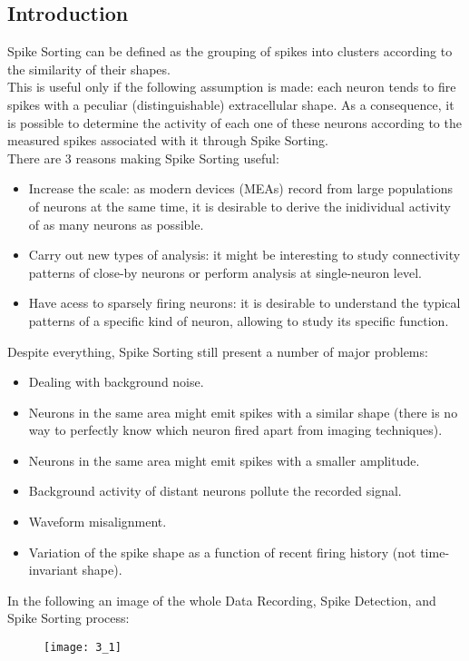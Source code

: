 \subsection{Introduction}
Spike Sorting can be defined as the grouping of spikes into clusters
according to the similarity of their shapes.\\
This is useful only if the following assumption is made: each neuron tends
to fire spikes with a peculiar (distinguishable) extracellular shape.
As a consequence, it is possible to determine the activity of each one of these
neurons according to the measured spikes associated with it through Spike Sorting.\\
There are 3 reasons making Spike Sorting useful:
\begin{itemize}
    \item Increase the scale: as modern devices (MEAs) record from large populations
          of neurons at the same time, it is desirable to derive the inidividual
          activity of as many neurons as possible.
    \item Carry out new types of analysis: it might be interesting to study
          connectivity patterns of close-by neurons or perform analysis at
          single-neuron level.
    \item Have acess to sparsely firing neurons: it is desirable to understand
          the typical patterns of a specific kind of neuron, allowing to study its
          specific function.
\end{itemize}
Despite everything, Spike Sorting still present a number of major problems:
\begin{itemize}
    \item Dealing with background noise.
    \item Neurons in the same area might emit spikes with a similar shape (there
          is no way to perfectly know which neuron fired apart from imaging techniques).
    \item Neurons in the same area might emit spikes with a smaller amplitude.
    \item Background activity of distant neurons pollute the recorded signal.
    \item Waveform misalignment.
    \item Variation of the spike shape as a function of recent firing history
          (not time-invariant shape).
\end{itemize}
In the following an image of the whole Data Recording, Spike Detection, and
Spike Sorting process:
\begin{figure}[H]
    \texttt{[image: 3\_1]}
    \centering
\end{figure}


